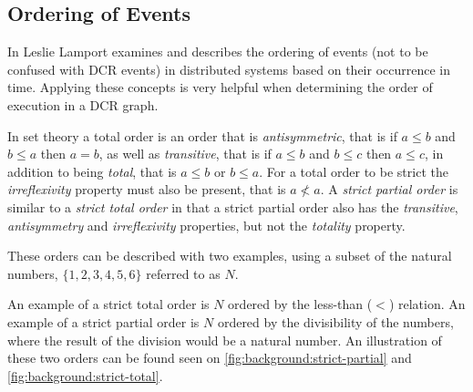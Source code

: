 		\subsection{Ordering of Events}\label{subsec:orderingofevents}
		In \cite{Lamport:1978:TCO:359545.359563} Leslie Lamport examines and describes the ordering of events (not to be confused with DCR events) in distributed systems based on their occurrence in time. Applying these concepts is very helpful when determining the order of execution in a DCR graph. 
		
		\newpar In set theory a total order is an order that is \textit{antisymmetric}, that is if $a \leq b$ and $b \leq a$ then $a = b$, as well as \textit{transitive}, that is if $a \leq b$ and $b \leq c$ then $a \leq c$, in addition to being \textit{total}, that is $a \leq b$ or $b \leq a$. For a total order to be strict the \textit{irreflexivity} property must also be present, that is $a \not< a$. A \textit{strict partial order} is similar to a \textit{strict total order} in that a strict partial order also has the \textit{transitive}, \textit{antisymmetry} and \textit{irreflexivity} properties, but not the \textit{totality} property.
		
		These orders can be described with two examples, using a subset of the natural numbers, $\{1, 2, 3, 4, 5, 6\}$ referred to as $N$. 
		
		An example of a strict total order is $N$ ordered by the less-than ($<$) relation. An example of a strict partial order is $N$ ordered by the divisibility of the numbers, where the result of the division would be a natural number. An illustration of these two orders can be found seen on \autoref{fig:background:strict-partial} and \autoref{fig:background:strict-total}.
	

